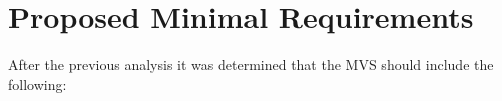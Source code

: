 \documentclass{l4proj}
\begin{document}


\section{Proposed Minimal Requirements}
\label{sec:proposed-minimal-requirements}
After the previous analysis it was determined that the MVS should include the following:
\end{document}
